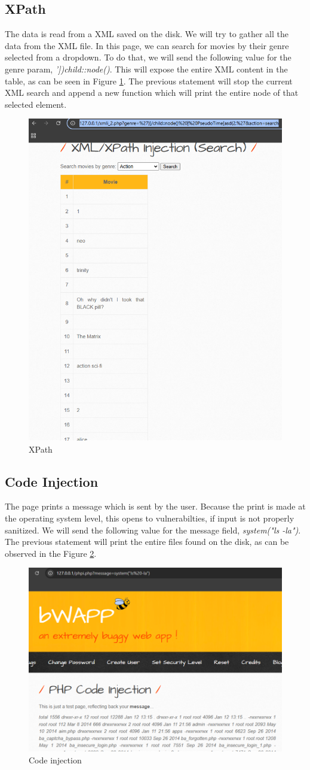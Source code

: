 \documentclass{article}
\begin{document}
\subsection{XPath}
The data is read from a XML saved on the disk. We will try to gather all the data from the XML file. In this page, we can search for movies by their genre selected from a dropdown. To do that, we will send the following value for the genre param, \textit{'])child::node()}. This will expose the entire XML content in the table, as can be seen in Figure \ref{fig:defensive-xpath}. The previous statement will stop the current XML search and append a new function which will print the entire node of that selected element.
\begin{figure}[H]
    \centering
    \includegraphics[width=0.5\linewidth]{Figures/defensive/xpath.PNG}
    \caption{XPath}
    \label{fig:defensive-xpath}
\end{figure}
\subsection{Code Injection}
The page prints a message which is sent by the user. Because the print is made at the operating system level, this opens to vulnerabilties, if input is not properly sanitized. We will send the following value for the message field, \textit{system("ls -la")}. The previous statement will print the entire files found on the disk, as can be observed in the Figure \ref{fig:defensive-code-injection}.
\begin{figure}[H]
    \centering
    \includegraphics[width=0.5\linewidth]{Figures/defensive/code-injection.PNG}
    \caption{Code injection}
    \label{fig:defensive-code-injection}
\end{figure}
\end{document}

